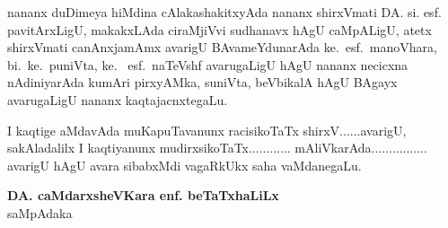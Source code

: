nananx duDimeya hiMdina cAlakashakitxyAda nananx shirxVmati DA. si. esf. pavitArx\-LigU, makakxLAda ciraMjiVvi sudhanavx hAgU caMpALigU, atetx shirxVmati canAnxjamAmx avarigU BAvameYdunarAda ke.~esf.~manoVhara, bi.~ke.~puniVta, ke.~ esf.~\hbox{naTeVshf} avarugaLigU hAgU nananx necicxna nAdiniyarAda kumAri pirxyAMka, suniVta, beVbikalA hAgU BAgayx avarugaLigU nananx kaqtajacnxtegaLu.

I kaqtige aMdavAda muKapuTavanunx racisikoTaTx shirxV......avarigU, sakAladalilx I kaqtiyanunx mudirxsikoTaTx............ mAliVkarAda................ avarigU hAgU avara sibabxMdi vagaRkUkx saha vaMdanegaLu.

\begin{flushright}
{\bf DA. caMdarxsheVKara enf. beTaTxhaLiLx}\\[3pt]
saMpAdaka\qquad\qquad\,
\end{flushright}

\newpage
\thispagestyle{empty}
~\phantom{a}

\newpage
